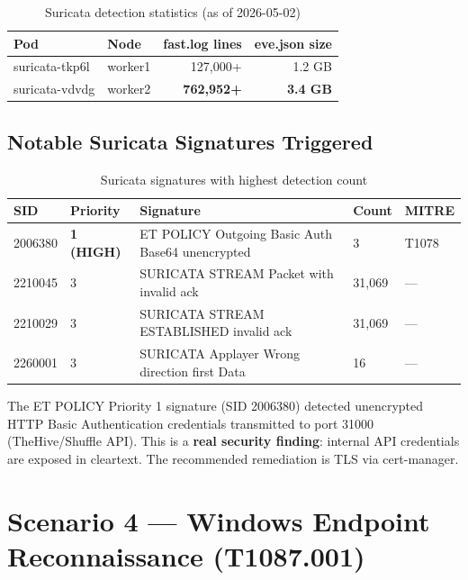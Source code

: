 \documentclass[12pt,a4paper]{report}
\begin{document}
\begin{table}[H]
\centering
\caption{Suricata detection statistics (as of 2026-05-02)}
\begin{tabular}{llrr}
\toprule
\textbf{Pod} & \textbf{Node} & \textbf{fast.log lines} & \textbf{eve.json size} \\
\midrule
suricata-tkp6l & worker1 & 127,000+ & 1.2 GB \\
suricata-vdvdg & worker2 & \textbf{762,952+} & \textbf{3.4 GB} \\
\bottomrule
\end{tabular}
\label{tab:suricata}
\end{table}

\subsection{Notable Suricata Signatures Triggered}

\begin{table}[H]
\centering
\caption{Suricata signatures with highest detection count}
\begin{tabularx}{\textwidth}{llXll}
\toprule
\textbf{SID} & \textbf{Priority} & \textbf{Signature} & \textbf{Count} & \textbf{MITRE} \\
\midrule
2006380 & \textcolor{alertred}{\textbf{1 (HIGH)}} & ET POLICY Outgoing Basic Auth Base64 unencrypted & 3 & T1078 \\
2210045 & 3 & SURICATA STREAM Packet with invalid ack & 31,069 & --- \\
2210029 & 3 & SURICATA STREAM ESTABLISHED invalid ack & 31,069 & --- \\
2260001 & 3 & SURICATA Applayer Wrong direction first Data & 16 & --- \\
\bottomrule
\end{tabularx}
\label{tab:suricatasigs}
\end{table}

The ET POLICY Priority 1 signature (SID 2006380) detected unencrypted HTTP Basic Authentication credentials transmitted to port 31000 (TheHive/Shuffle API). This is a \textbf{real security finding}: internal API credentials are exposed in cleartext. The recommended remediation is TLS via cert-manager.

\section{Scenario 4 --- Windows Endpoint Reconnaissance (T1087.001)}
\end{document}
